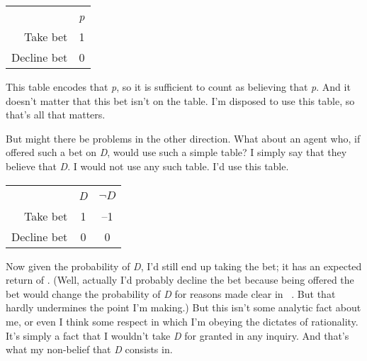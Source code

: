 \begin{center}
\begin{tabular}{rc}
&\emph{p}\\
Take bet&1\\
Decline bet&0\\
\end{tabular}
\end{center}
%
%
%
%
This table encodes that \emph{p}, so it is sufficient to count as believing that \emph{p}. And it doesn't matter that this bet isn't on the table. I'm disposed to use this table, so that's all that matters.

But might there be problems in the other direction. What about an agent who, if offered such a bet on \emph{D}, would use such a simple table? I simply say that they believe that \emph{D}. I would not use any such table. I'd use this table.

\begin{center}
\begin{tabular}{rcc}
&\emph{D}&$\neg D$\\
Take bet&1&--1\\
Decline bet&0&0\\
\end{tabular}
\end{center}
%
%
%
Now given the probability of \emph{D}, I'd still end up taking the bet; it has an expected return of . (Well, actually I'd probably decline the bet because being offered the bet would change the probability of \emph{D} for reasons made clear in ~\citep[14--15]{RunyonGuysDolls}. But that hardly undermines the point I'm making.) But this isn't some analytic fact about me, or even I think some respect in which I'm obeying the dictates of rationality. It's simply a fact that I wouldn't take \emph{D} for granted in any inquiry. And that's what my non-belief that \emph{D} consists in.

